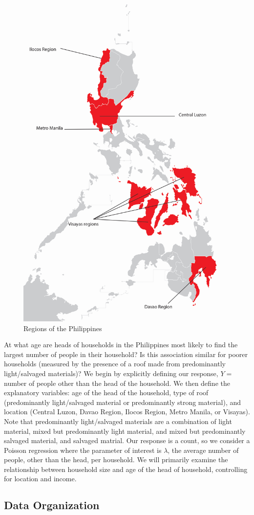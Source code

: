 \documentclass[
]{krantz}
\begin{document}
\begin{figure}
\includegraphics[width=0.5\linewidth]{data/map_of_philippines} \caption{Regions of the Philippines}\label{fig:philippinesmap}
\end{figure}

At what age are heads of households in the Philippines most likely to find the largest number of people in their household? Is this association similar for poorer households (measured by the presence of a roof made from predominantly light/salvaged materials)? We begin by explicitly defining our response, \(Y=\) number of people other than the head of the household. We then define the explanatory variables: age of the head of the household, type of roof (predominantly light/salvaged material or predominantly strong material), and location (Central Luzon, Davao Region, Ilocos Region, Metro Manila, or Visayas). Note that predominantly light/salvaged materials are a combination of light material, mixed but predominantly light material, and mixed but predominantly salvaged material, and salvaged matrial. Our response is a count, so we consider a Poisson regression where the parameter of interest is \(\lambda\), the average number of people, other than the head, per household. We will primarily examine the relationship between household size and age of the head of household, controlling for location and income.

\hypertarget{organizedata1}{%
\subsection{Data Organization}\label{organizedata1}}
\end{document}
